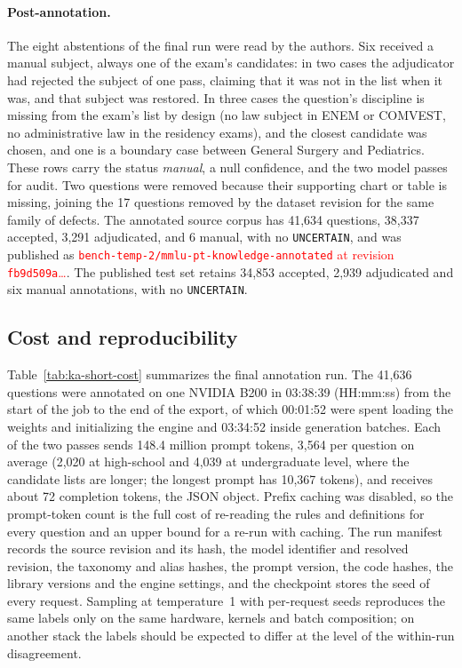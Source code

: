 \paragraph{Post-annotation.} The eight abstentions of the final run were
read by the authors. Six received a manual subject, always one of the exam's
candidates: in two cases the adjudicator had rejected the subject of one pass,
claiming that it was not in the list when it was, and that subject was
restored. In three cases the question's discipline is missing from the exam's
list by design (no law subject in ENEM or COMVEST, no administrative law in
the residency exams), and the closest candidate was chosen, and one is a boundary
case between General Surgery and Pediatrics. These rows carry the status
\emph{manual}, a null confidence, and the two model passes for audit. Two
questions were removed because their supporting chart or table is missing,
joining the 17 questions removed by the dataset revision for the same family
of defects. The annotated source corpus has 41,634 questions, 38,337 accepted, 3,291
adjudicated, and 6 manual, with no \texttt{UNCERTAIN}, and was published as
\textcolor{red}{\texttt{bench-temp-2/mmlu-pt-knowledge-annotated} at revision
\texttt{fb9d509a}\ldots}.
The published test set retains 34,853 accepted, 2,939 adjudicated and six
manual annotations, with no \texttt{UNCERTAIN}.

\subsection{Cost and reproducibility}
\label{app:ka-short-cost}

Table~\ref{tab:ka-short-cost} summarizes the final annotation run. The 41,636 questions
were annotated on one NVIDIA B200 in 03:38:39 (HH:mm:ss) from the start
of the job to the end of the export, of which 00:01:52 were spent loading the
weights and initializing the engine and 03:34:52 inside generation batches.
Each of the two passes sends 148.4 million prompt tokens, 3,564 per question
on average (2,020 at high-school and 4,039 at undergraduate level, where the
candidate lists are longer; the longest prompt has 10,367 tokens), and
receives about 72 completion tokens, the JSON object. Prefix caching was
disabled, so the prompt-token count is the full cost of re-reading the rules
and definitions for every question and an upper bound for a re-run with
caching. The run manifest records the source revision and its hash, the model
identifier and resolved revision, the taxonomy and alias hashes, the prompt
version, the code hashes, the library versions and the engine settings, and
the checkpoint stores the seed of every request. Sampling at temperature~1
with per-request seeds reproduces the same labels only on the same hardware,
kernels and batch composition; on another stack the labels should be expected
to differ at the level of the within-run disagreement.

